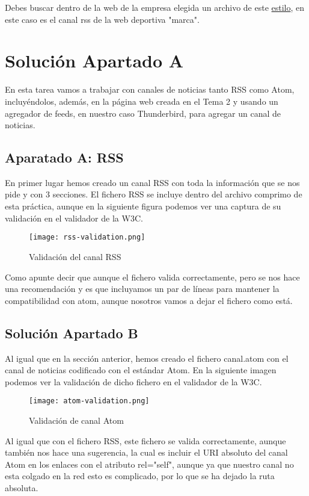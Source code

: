 Debes buscar dentro de la web de la empresa elegida un archivo de este \href{https://e00-marca.uecdn.es/rss/portada.xml}{estilo}, en este caso es el canal rss de la web deportiva "marca".

\section{Solución Apartado A}
En esta tarea vamos a trabajar con canales de noticias tanto RSS como Atom, incluyéndolos, además, en la página web creada en el Tema 2 y usando un agregador de feeds, en nuestro caso Thunderbird, para agregar un canal de noticias.

\subsection{Aparatado A: RSS}

En primer lugar hemos creado un canal RSS con toda la información que se nos pide y con 3 secciones. El fichero RSS se incluye dentro del archivo comprimo de esta práctica, aunque en la siguiente figura podemos ver una captura de su validación en el validador de la W3C.

\begin{figure}[H]
    \centering
    \texttt{[image: rss-validation.png]}
    \caption{Validación del canal RSS}
\end{figure}

Como apunte decir que aunque el fichero valida correctamente, pero se nos hace una recomendación y es que incluyamos un par de líneas para mantener la compatibilidad con atom, aunque nosotros vamos a dejar el fichero como está.

\subsection{Solución Apartado B}
Al igual que en la sección anterior, hemos creado el fichero canal.atom con el canal de noticias codificado con el estándar Atom. En la siguiente imagen podemos ver la validación de dicho fichero en el validador de la W3C.

\begin{figure}[H]
    \centering
    \texttt{[image: atom-validation.png]}
    \caption{Validación de canal Atom}
\end{figure}

Al igual que con el fichero RSS, este fichero se valida correctamente, aunque también nos hace una sugerencia, la cual es incluir el URI absoluto del canal Atom en los enlaces con el atributo rel="self", aunque ya que nuestro canal no esta colgado en la red esto es complicado, por lo que se ha dejado la ruta absoluta.

